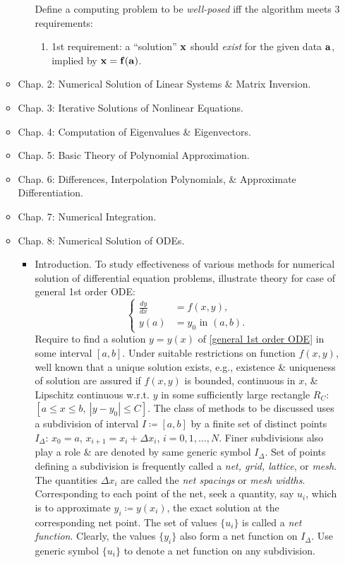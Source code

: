 \documentclass{article}
\begin{document}
\begin{enumerate}
\begin{itemize}
\begin{itemize}
			Define a computing problem to be {\it well-posed} iff the algorithm meets 3 requirements:
			\begin{enumerate}
				\item 1st requirement: a ``solution'' $\bf x$ should {\it exist} for the given data $\bf a$, implied by ${\bf x} = {\bf f}({\bf a})$.
			\end{enumerate}
		\end{itemize}
		\item {\sf Chap. 2: Numerical Solution of Linear Systems \& Matrix Inversion.}
		\item {\sf Chap. 3: Iterative Solutions of Nonlinear Equations.}
		\item {\sf Chap. 4: Computation of Eigenvalues \& Eigenvectors.}
		\item {\sf Chap. 5: Basic Theory of Polynomial Approximation.}
		\item {\sf Chap. 6: Differences, Interpolation Polynomials, \& Approximate Differentiation.}
		\item {\sf Chap. 7: Numerical Integration.}
		\item {\sf Chap. 8: Numerical Solution of ODEs.}
		\begin{itemize}
			\item {\sf Introduction.} To study effectiveness of various methods for numerical solution of differential equation problems, illustrate theory for case of general 1st order ODE:
			\begin{equation}
				\label{general 1st order ODE}
				\tag{g1ODE}
				\left\{\begin{split}
					\frac{dy}{dx} &= f(x,y),\\
					y(a) &= y_0\mbox{ in }(a,b).
				\end{split}\right.
			\end{equation}
			Require to find a solution $y = y(x)$ of \eqref{general 1st order ODE} in some interval $[a,b]$. Under suitable restrictions on function $f(x,y)$, well known that a unique solution exists, e.g., existence \& uniqueness of solution are assured if $f(x,y)$ is bounded, continuous in $x$, \& Lipschitz continuous w.r.t. $y$ in some sufficiently large rectangle $R_C$: $[a\le x\le b,\ |y - y_0|\le C]$. The class of methods to be discussed uses a subdivision of interval $I\coloneqq[a,b]$ by a finite set of distinct points $I_\Delta$: $x_0 = a$, $x_{i+1} = x_i + \Delta x_i$, $i = 0,1,\ldots,N$. Finer subdivisions also play a role \& are denoted by same generic symbol $I_\Delta$. Set of points defining a subdivision is frequently called a {\it net, grid, lattice}, or {\it mesh}. The quantities $\Delta x_i$ are called the {\it net spacings} or {\it mesh widths}. Corresponding to each point of the net, seek a quantity, say $u_i$, which is to approximate $y_i\coloneqq y(x_i)$, the exact solution at the corresponding net point. The set of values $\{u_i\}$ is called a {\it net function}. Clearly, the values $\{y_i\}$ also form a net function on $I_\Delta$. Use generic symbol $\{u_i\}$ to denote a net function on any subdivision.
			

\end{itemize}
\end{itemize}
\end{enumerate}
\end{document}
